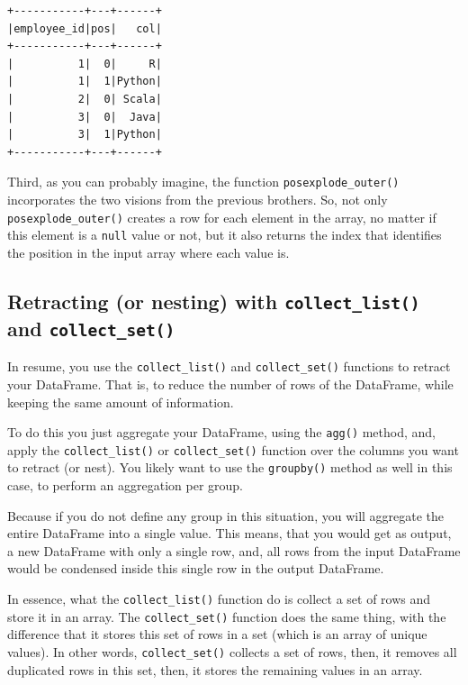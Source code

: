 \documentclass[
  11pt,
  letterpaper,
  DIV=11,
  numbers=noendperiod]{scrreprt}
\begin{document}
\begin{verbatim}
+-----------+---+------+
|employee_id|pos|   col|
+-----------+---+------+
|          1|  0|     R|
|          1|  1|Python|
|          2|  0| Scala|
|          3|  0|  Java|
|          3|  1|Python|
+-----------+---+------+
\end{verbatim}

Third, as you can probably imagine, the function
\texttt{posexplode\_outer()} incorporates the two visions from the
previous brothers. So, not only \texttt{posexplode\_outer()} creates a
row for each element in the array, no matter if this element is a
\texttt{null} value or not, but it also returns the index that
identifies the position in the input array where each value is.

\hypertarget{retracting-or-nesting-with-collect_list-and-collect_set}{%
\subsection{\texorpdfstring{Retracting (or nesting) with
\texttt{collect\_list()} and
\texttt{collect\_set()}}{Retracting (or nesting) with collect\_list() and collect\_set()}}\label{retracting-or-nesting-with-collect_list-and-collect_set}}

In resume, you use the \texttt{collect\_list()} and
\texttt{collect\_set()} functions to retract your DataFrame. That is, to
reduce the number of rows of the DataFrame, while keeping the same
amount of information.

To do this you just aggregate your DataFrame, using the \texttt{agg()}
method, and, apply the \texttt{collect\_list()} or
\texttt{collect\_set()} function over the columns you want to retract
(or nest). You likely want to use the \texttt{groupby()} method as well
in this case, to perform an aggregation per group.

Because if you do not define any group in this situation, you will
aggregate the entire DataFrame into a single value. This means, that you
would get as output, a new DataFrame with only a single row, and, all
rows from the input DataFrame would be condensed inside this single row
in the output DataFrame.

In essence, what the \texttt{collect\_list()} function do is collect a
set of rows and store it in an array. The \texttt{collect\_set()}
function does the same thing, with the difference that it stores this
set of rows in a set (which is an array of unique values). In other
words, \texttt{collect\_set()} collects a set of rows, then, it removes
all duplicated rows in this set, then, it stores the remaining values in
an array.
\end{document}

